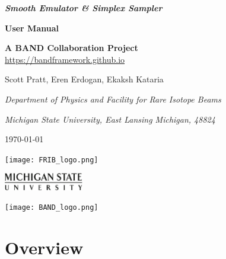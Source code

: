 \documentclass[12pt]{article}
\numberwithin{equation}{section}
\numberwithin{figure}{section}
\begin{document}
\begin{titlepage}
   \begin{center}
       \vspace*{2.5cm}

       {\bf\LARGE {\it Smooth Emulator \&  Simplex Sampler}}\\
       \vspace*{8pt}

       {\bf\Large User Manual}

       {\bf A BAND Collaboration Project}\\
       \href{https://bandframework.github.io}{https://bandframework.github.io}

       \vspace{2.0cm}

       {\large Scott Pratt, Eren Erdogan, Ekaksh Kataria}

       {\it Department of Physics and Facility for Rare Isotope Beams}

       {\it Michigan State University, East Lansing Michigan, 48824}

       \today
  \end{center}
       
    \vspace*{1.0in}
     
       \hspace*{1.0in}\texttt{[image: FRIB\_logo.png]}

       \vspace*{-1.3in}
       \hspace*{2.63in}\includegraphics[width=0.26\textwidth]{msu_logo}

       \vspace*{-0.7in}
       \hspace*{4.6in}
       \texttt{[image: BAND\_logo.png]}
            

\end{titlepage}

\newpage

\thispagestyle{empty}

\tableofcontents

\newpage

\thispagestyle{empty}

\section{Overview}\label{sec:overview}
\end{document}
